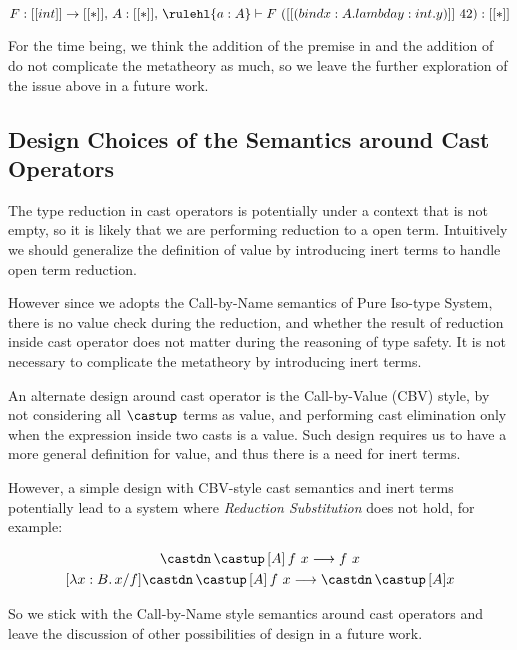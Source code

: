 \begin{equation*}
    F : [[int]] \rightarrow [[*]],\, A : [[*]],\, \rulehl{a : A} \vdash F ~ ([[(bind x : A. lambda y : int. y)]]~ 42) : [[*]]
\end{equation*}

For the time being, we think the addition of the premise in  and
the addition of  do not complicate the metatheory as much, so
we leave the further exploration of the issue above in a future work.

\subsection{Design Choices of the Semantics around Cast Operators}
\label{sec:cast-design}

The type reduction in cast operators is potentially under a context that
is not empty, so it is likely that we are performing reduction to a open term.
Intuitively we should generalize the definition of value by introducing inert
terms\cite{yang2017unifying} to handle open term reduction.

However since we adopts the Call-by-Name semantics of Pure Iso-type System\cite{yang2019pure},
there is no value check during the reduction, and whether the result of reduction
inside cast operator does not matter during the reasoning of type safety. It is
not necessary to complicate the metatheory by introducing inert terms.

An alternate design around cast operator is the Call-by-Value (CBV) style\cite{yang2019pure},
by not considering all $\castup$ terms as value, and performing cast elimination only
when the expression inside two casts is a value. Such design requires us to
have a more general definition for value, and thus there is a need for inert terms.

However, a simple design with CBV-style cast semantics and inert terms
potentially lead to a system where \emph{Reduction Substitution} does not hold,
for example:

\begin{gather*}
    \castdn \, \castup \, [A] \, f ~ x \longrightarrow f ~ x \\
    [\lambda x : B. \, x / f] \castdn \, \castup \, [A] \, f ~ x \longrightarrow \castdn \, \castup \, [A] x
\end{gather*}

So we stick with the Call-by-Name style semantics around cast operators and
leave the discussion of other possibilities of design in a future work.
